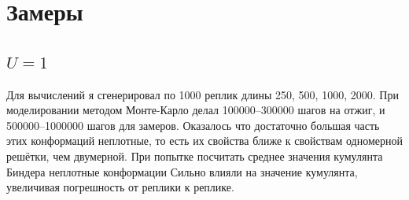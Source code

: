 \section{Замеры}

\subsection{$U = 1$}
Для вычислений я сгенерировал по 1000 реплик длины 250, 500, 1000, 2000. При моделировании методом Монте-Карло делал 100000--300000 шагов на отжиг, и 500000--1000000 шагов для замеров. 
Оказалось что достаточно большая часть этих конформаций неплотные, то есть их свойства ближе к свойствам одномерной решётки, чем двумерной. При попытке посчитать среднее значения кумулянта Биндера неплотные конформации Сильно влияли на значение кумулянта, увеличивая погрешность от реплики к реплике.

